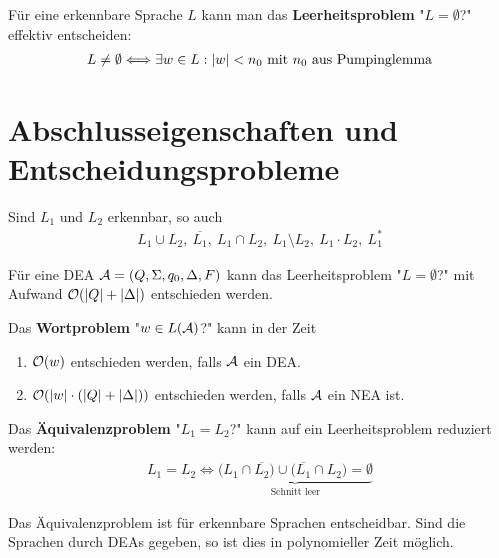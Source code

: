 \begin{satz}\label{satz3.3}
	Für eine erkennbare Sprache $L$ kann man das \textbf{Leerheitsproblem} "$L=\emptyset$?" effektiv entscheiden:
	\begin{align*}
		L\neq\emptyset\Longleftrightarrow\exists w\in L:|w|<n_0\mit n_0\text{ aus Pumpinglemma}
	\end{align*}
\end{satz}	

\section{Abschlusseigenschaften und Entscheidungsprobleme}

\begin{satz}\label{satz4.1}\enter
	Sind $L_1$ und $L_2$ erkennbar, so auch
	\begin{align*}
		L_1\cup L_2,~\overline{L_1},~L_1\cap L_2,~L_1\setminus L_2,~L_1\cdot L_2,~L_1^\ast
	\end{align*}
\end{satz}

\begin{satz}\label{satz4.3}
	Für eine DEA $\A=(Q,\Sigma,q_0,\Delta,F)$ kann das Leerheitsproblem "$L=\emptyset$?" mit Aufwand $\O(|Q|+|\Delta|)$ entschieden werden.
\end{satz}

\begin{satz}\label{satz4.4+4.5}
	Das \textbf{Wortproblem} "$w\in L(\A)$?" kann in der Zeit
	\begin{enumerate}
		\item $\O(w)$ entschieden werden, falls $\A$ ein DEA.
		\item $\O(|w|\cdot(|Q|+|\Delta|))$ entschieden werden, falls $\A$ ein NEA ist.
	\end{enumerate}
\end{satz}

Das \textbf{Äquivalenzproblem} "$L_1=L_2$?" kann auf ein Leerheitsproblem reduziert werden:
\begin{align*}
	L_1=L_2\Longleftrightarrow\underbrace{\big(L_1\cap\overline{L_2}\big)\cup\big(\overline{L_1}\cap L_2\big)=\emptyset}_{\text{Schnitt leer}}
\end{align*}

\begin{satz}\label{satz4.6}
	Das Äquivalenzproblem ist für erkennbare Sprachen entscheidbar.
	Sind die Sprachen durch DEAs gegeben, so ist dies in polynomieller Zeit möglich.
\end{satz}

